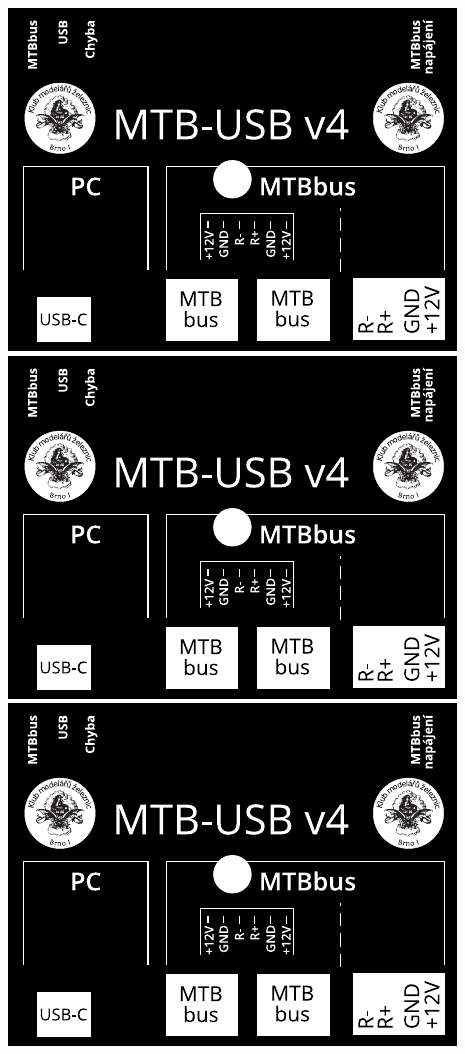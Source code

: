 \documentclass[12pt,a4paper,landscape]{article}
\begin{document}
\pagestyle{empty}
\setlength{\parindent}{0cm}
\setlength{\parskip}{3mm plus2pt minus2pt}

\noindent
\includegraphics{single.pdf}
\includegraphics{single.pdf}
\includegraphics{single.pdf}
\end{document}
